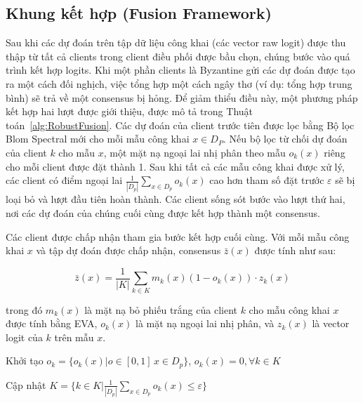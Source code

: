 \subsection{Khung kết hợp (Fusion Framework)}
Sau khi các dự đoán trên tập dữ liệu công khai (các vector raw logit) được thu thập từ tất cả clients trong client điều phối được bầu chọn, chúng bước vào quá trình kết hợp logits. Khi một phần clients là Byzantine gửi các dự đoán được tạo ra một cách đối nghịch, việc tổng hợp một cách ngây thơ (ví dụ: tổng hợp trung bình) sẽ trả về một consensus bị hỏng. Để giảm thiểu điều này, một phương pháp kết hợp hai lượt được giới thiệu, được mô tả trong Thuật toán~\ref{alg:RobustFusion}. Các dự đoán của client trước tiên được lọc bằng Bộ lọc Blom Spectral mới cho mỗi mẫu công khai $x \in D_P$. Nếu bộ lọc từ chối dự đoán của client $k$ cho mẫu $x$, một mặt nạ ngoại lai nhị phân theo mẫu $o_k(x)$ riêng cho mỗi client được đặt thành 1. Sau khi tất cả các mẫu công khai được xử lý, các client có điểm ngoại lai $\frac{1}{|D_p|}\sum_{x \in D_p}o_k(x)$ cao hơn tham số đặt trước $\varepsilon$ sẽ bị loại bỏ và lượt đầu tiên hoàn thành. Các client sống sót bước vào lượt thứ hai, nơi các dự đoán của chúng cuối cùng được kết hợp thành một consensus.

Các client được chấp nhận tham gia bước kết hợp cuối cùng. Với mỗi mẫu công khai $x$ và tập dự đoán được chấp nhận, consensus $\bar z(x)$ được tính như sau:

\begin{equation}
\label{FinalFusion}
\bar z(x)=\frac{1}{|K|}\sum_{k \in K}m_k(x) (1-o_k(x))\cdot z_k(x)
\end{equation}

trong đó $m_k(x)$ là mặt nạ bỏ phiếu trắng của client $k$ cho mẫu công khai $x$ được tính bằng EVA, $o_k(x)$ là mặt nạ ngoại lai nhị phân, và $z_k(x)$ là vector logit của $k$ trên mẫu $x$.

\begin{algorithm}[H]
\label{alg:RobustFusion}
\caption{Kết hợp Logits chống chịu đầu độc}

Khởi tạo $o_k = \{o_k(x)|o \in [0,1]\,x \in D_p\}$, $o_k(x)=0, \forall k \in K$\;


Cập nhật $K = \{k \in K | \frac{1}{|D_p|}\sum_{x \in D_p}o_k(x) \leq \varepsilon\}$ \;

\end{algorithm}

